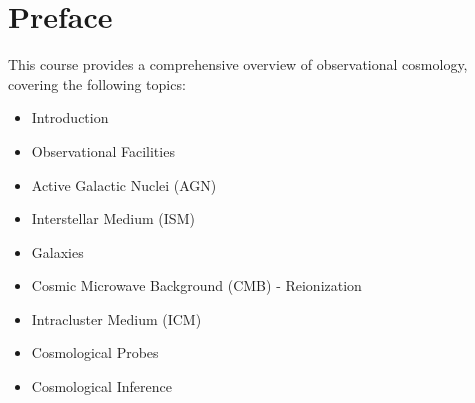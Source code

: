 \section*{Preface}

This course provides a comprehensive overview of observational cosmology, covering the following topics:

\begin{itemize}
    \item Introduction
    \item Observational Facilities
    \item Active Galactic Nuclei (AGN)
    \item Interstellar Medium (ISM)
    \item Galaxies
    \item Cosmic Microwave Background (CMB) - Reionization
    \item Intracluster Medium (ICM)
    \item Cosmological Probes
    \item Cosmological Inference
\end{itemize}
